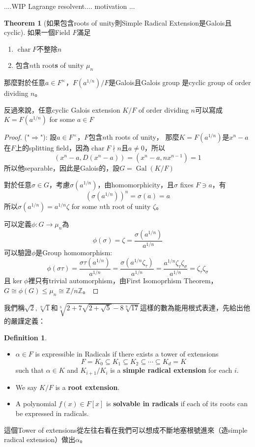 \documentclass[12pt]{article}
\theoremstyle{definition}
\newtheorem{thm}{Theorem}
\newtheorem{dfn}{Definition}
\newcommand{\ZZ}{\mathbb Z}
\newcommand{\cbrt}[1]{\sqrt[3]{#1}}
\DeclareMathOperator{\Char}{char}
\DeclareMathOperator{\Gal}{Gal}
\begin{document}
....WIP Lagrange resolvent.... motivation ...

\begin{thm}[如果包含roots of unity則Simple Radical Extension是Galois且cyclic]\label{simple_radical_extension_galois_cyclic}
	如果一個Field $F$滿足
	\begin{enumerate}
		\item $\Char{F}$不整除$n$
		\item 包含$n$th root\textbf{s} of unity $\mu_n$
	\end{enumerate}
	那麼對於任意$a\in F^\times$，$F(a^{1/n})/F$是Galois且Galois group
	是cyclic group of order dividing $n$。

	反過來說，任意cyclic Galois extension $K/F$
	of order dividing $n$可以寫成$K=F(a^{1/n})$ for some $a\in F$
\end{thm}

\begin{proof}
	\noindent ("$\Rightarrow$"): 設$a\in F^\times$，$F$包含$n$th roots of unity，
	那麼$K=F(a^{1/n})$是$x^n-a$在$F$上的splitting field，因為$\Char F\nmid n$且$a\neq 0$，所以
	\[(x^n-a, D(x^n-a))=(x^n-a, nx^{n-1})=1\]
	所以他separable，因此是Galois的，設$G=\Gal(K/F)$
	
	對於任意$\sigma\in G$，考慮$\sigma(a^{1/n})$，由homomorphicity，且$\sigma$ fixes $F\ni a$，有
	\[
	(\sigma(a^{1/n}))^n=\sigma(a)=a
	\]
	所以$\sigma(a^{1/n})=a^{1/n}\zeta$ for some $n$th root of unity $\zeta$。
	
	可以定義$\phi:G\to\mu_n$為
	\[\phi(\sigma)=\zeta=\frac{\sigma(a^{1/n})}{a^{1/n}}\]
	可以驗證$\phi$是Group homomorphism:
	\[\phi(\sigma\tau)=\frac{\sigma\tau(a^{1/n})}{a^{1/n}}  
	=  \frac{\sigma(a^{1/n}\zeta_\tau)}{a^{1/n}}
	=  \frac{a^{1/n}\zeta_\tau\zeta_\sigma}{a^{1/n}}
	=\zeta_\tau \zeta_\sigma\]
	且$\ker\phi$裡只有trivial automorphism，由First Isomoprhism Theorem，$G\cong \phi(G) \le \mu_n\cong \ZZ/n\ZZ$。 
\end{proof}

我們稱$\sqrt{2}, \sqrt[n]{1}$和$\cbrt{2+7\sqrt{2+\sqrt5}-8\sqrt[9]{17}}$這樣的數為能用根式表達，先給出他的嚴謹定義：
\begin{dfn}
	\begin{itemize}
		\item 	$\alpha\in F$ is expressible in Radicals if there exists a tower of extensions
	\[F=K_0 \subseteq K_1 \subseteq K_2 \subseteq \cdots \subseteq K_d=K \]
	such that $\alpha\in K$ and $K_{i+1}/K_i$ is a \textbf{simple radical extension} for each $i$.
	\item We say $K/F$ is a \textbf{root extension}.
	\item A polynomial $f(x)\in F[x]$ is \textbf{solvable in radicals} if each of its roots can be expressed in radicals.
	\end{itemize}
\end{dfn}
這個Tower of extensions從左往右看在我們可以想成不斷地塞根號進來（造simple radical extension）做出$\alpha$。
\end{document}
